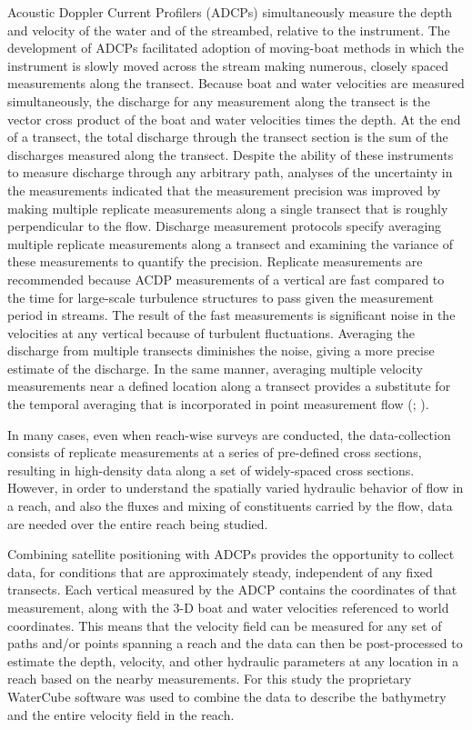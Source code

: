 \documentclass[Journal,letterpaper,BackFigs]{ascelike-new}
\begin{document}
Acoustic Doppler Current Profilers (ADCPs) simultaneously measure the depth and velocity of the water and of the streambed, relative to the instrument. The development of ADCPs facilitated adoption of moving-boat methods in which the instrument is slowly moved across the stream making numerous, closely spaced measurements along the transect. Because boat and water velocities are measured simultaneously, the discharge for any measurement along the transect is the vector cross product of the boat and water velocities times the depth. At the end of a transect, the total discharge through the transect section is the sum of the discharges measured along the transect. Despite the ability of these instruments to measure discharge through any arbitrary path, analyses of the uncertainty in the measurements indicated that the measurement precision was improved by making multiple replicate measurements along a single transect that is roughly perpendicular to the flow. Discharge measurement protocols \cite{Mueller:2013} specify averaging multiple replicate measurements along a transect and examining the variance of these measurements to quantify the precision. Replicate measurements are recommended because ACDP measurements of a vertical are fast compared to the time for large-scale turbulence structures to pass given the measurement period in streams. The result of the fast measurements is significant noise in the velocities at any vertical because of turbulent fluctuations. Averaging the discharge from multiple transects diminishes the noise, giving a more precise estimate of the discharge. In the same manner, averaging multiple velocity measurements near a defined location along a transect provides a substitute for the temporal averaging that is incorporated in point measurement flow (; ). 

In many cases, even when reach-wise surveys are conducted, the data-collection consists of replicate measurements at a series of pre-defined cross sections, resulting in high-density data along a set of widely-spaced cross sections. However, in order to understand the spatially varied hydraulic behavior of flow in a reach, and also the fluxes and mixing of constituents carried by the flow, data are needed over the entire reach being studied.

Combining satellite positioning with ADCPs provides the opportunity to collect data, for conditions that are approximately steady, independent of any fixed transects. Each vertical measured by the ADCP contains the coordinates of that measurement, along with the 3-D boat and water velocities referenced to world coordinates. This means that the velocity field can be measured for any set of paths and/or points spanning a reach and the data can then be post-processed to estimate the depth, velocity, and other hydraulic parameters at any location in a reach based on the nearby measurements. For this study the proprietary WaterCube software was used to combine the data to describe the bathymetry and the entire velocity field in the reach.  
\end{document}
